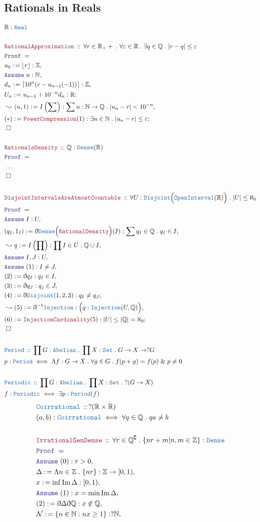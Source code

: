\documentclass[12pt]{scrartcl}
\newcommand{\TYPE}[1]{\textcolor{NavyBlue}{\mathtt{#1}}}
\newcommand{\LOGIC}[1]{\textcolor{Blue}{\mathtt{#1}}}
\newcommand{\THM}[1]{\textcolor{Maroon}{\mathtt{#1}}}
\renewcommand{\.}{\; . \;}
\newcommand{\de}{: \kern 0.1pc =}
\newcommand{\Theorem}[2]{& \THM{#1} \, :: \, #2 \\ & \Proof = \\ }
\newcommand{\DeclareType}[2]{& \TYPE{#1} \, :: \, #2 \\}
\newcommand{\DefineType}[3]{& #1 : \TYPE{#2} \iff #3 \\}
\newcommand{\Page}[1]{ \begin{align*} #1 \end{align*}   }
\newcommand{ \bd }{ \ByDef }
\newcommand{\NoProof}{ & \ldots \\ \EndProof}
\renewcommand{\And}{\; \& \;}
\newcommand{\Int}{\mathbb{Z} }
\newcommand{\Reals}{\mathbb{R} }
\newcommand{\Rats}{\mathbb{Q} }
\newcommand{\Nat}{\mathbb{N} }
\DeclareMathOperator*{\im}{Im}
\renewcommand{\c}{\complement}
\newcommand{\Say}[3]{& #1 \de #2 : #3, \\}
\newcommand{\Conclude}[3]{& #1 \de #2 : #3; \\}
\newcommand{\Derive}[3]{& \leadsto #1 \de #2 : #3, \\}
\newcommand{\Assume}[2]{& \LOGIC{Assume} \;#1 : #2, \\}
\newcommand{\QED}{\; \square}
\newcommand{\EndProof}{& \QED \\}
\newcommand{\ByDef}{\eth}
\newcommand{\Proof}{\LOGIC{Proof} \; }
\begin{document}
\subsection{Rationals in Reals}
\Page{
	& \Reals : \TYPE{Real}\\
	\\
	\Theorem{RationalApproximation}{ \forall r \in \Reals_++ \.  \forall  \varepsilon \in \Reals \. 
		\exists q \in \Rats \. |r - q| \le \varepsilon }
	\Say{u_0}{ \lfloor r \rfloor}{\Int}
	\Assume{n}{\Nat}
	\Say{d_n}{\lceil 10^n(r - u_{n-1}(-1)) \rceil}{\Int}
	\Conclude{U_n}{u_{n-1}  + 10^{-n}d_n}{\Reals}
	\Derive{(u,1)}{I\left(\sum \right)}{ \sum u : \Nat \to \Rats \.  |u_n - r | < 10^{-n} }
	\Conclude{(*)}{\THM{PowerCompression}(1)}{ \exists n \in \Nat \.  |u_n - r| \le \varepsilon}
	\EndProof
	\\
	\Theorem{RationalsDensity}{ \Rats : \TYPE{Dense}(\Reals)}
	\NoProof
	\\
	\Theorem{DisjointIntervalsAreAtmostCountable}{
		\forall U : \TYPE{Disjoint}\Big(\TYPE{OpenInterval}(\Reals)\Big) \. |U| \le \aleph_0  }
	\Assume{I}{U}
	\Conclude{(q_I,1_I)}{\bd \TYPE{Dense}\Big(\THM{RationalDensity}\Big)(I)}{\sum q_I \in \Rats \. q_I \in I}
	\Derive{q}{I\left(\prod\right)}{ \prod I \in U \. \Rats \cup I  }
	\Assume{I,J}{U}
	\Assume{(1)}{I \neq J}
	\Say{(2)}{\bd q_I}{q_I \in I}
	\Say{(3)}{\bd q_J}{q_j \in J}
	\Conclude{(4)}{\bd \TYPE{Disjoint}(1,2,3)}{q_I \neq q_J}
	\Derive{(5)}{\bd^{-1} \TYPE{Injection}}{\Big( q : \TYPE{Injection}(U,\Rats)  \Big)}
	\Conclude{(6)}{ \THM{InjectionCardinality}(5) }{  |U| \le |\Rats| = \aleph_0     }
	\EndProof
	\\
	\DeclareType{Period}{\prod G : \TYPE{Abelian} \. \prod X : \TYPE{Set} \. G \to X \to ?G}
	\DefineType{p}{Period}{ \Lambda f : G \to X \. \forall g \in G \. f(p +g) = f(p) \And p \neq 0}
	\\
	\DeclareType{Periodic}{\prod G : \TYPE{Abelian} \. \prod X : \TYPE{Set} \. ?(G \to X)}
	\DefineType{f}{Periodic}{\exists p : \TYPE{Period}(f)}
}\Page{
	\DeclareType{Coirrational}{ ?(\Reals \times \Reals)}
	\DefineType{(a,b)}{Coirrational}{\forall q \in \Rats \. qa \neq b}
	\\
	\Theorem{IrrationalGenDense}{\forall r \in \Rats^\c \. \{  nr + m | n,m \in \Int \} : \TYPE{Dense}}
	\Assume{(0)}{r > 0}
	\Say{\Delta}{\Lambda n \in \Int \. \{nr\} }{ \Int \to [0,1)  }
	\Say{x}{ \inf \im \Delta }{ [0,1) }
	\Assume{(1)}{ x = \min \im \Delta }
	\Say{(2)}{\bd \Delta \bd \Rats}{x \not \in \Rats}
	\Say{\mathcal{N}}{ \{ n \in \Nat : nx \ge  1  \} }{  ?\Nat  }
}
\end{document}
